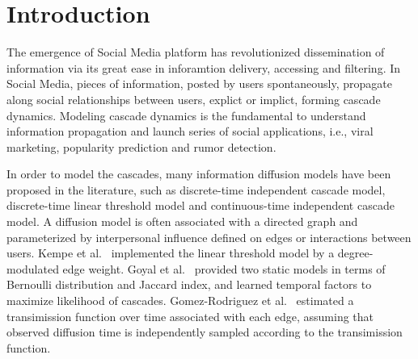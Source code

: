 \section{Introduction}

The emergence of Social Media platform has revolutionized dissemination of
information via its great ease in inforamtion delivery, accessing and filtering. 
In Social Media, pieces of information, posted by users spontaneously, propagate
along social relationships between users, explict or implict, forming cascade dynamics.
Modeling cascade dynamics is the fundamental to understand information
propagation and launch series of social applications, i.e., viral marketing,
popularity prediction and rumor detection. 

In order to model the cascades, many information diffusion models have been
proposed in the literature, such as discrete-time independent cascade model,
discrete-time linear threshold model and continuous-time independent cascade
model. A diffusion model is often associated with a directed graph and 
parameterized by interpersonal influence defined on edges or
interactions between users. Kempe et al.~\cite{kempe2003maximizing} implemented
the linear threshold model by a degree-modulated edge weight. Goyal et
al.~\cite{goyal2010learning} provided two static models in terms of Bernoulli
distribution and Jaccard index, and learned temporal factors to maximize
likelihood of cascades. Gomez-Rodriguez et al.~\cite{gomez2013modeling}
estimated a transimission function over time associated with each edge, assuming
that observed diffusion time is independently sampled according to the
transimission function. 

% 
% 
% 

